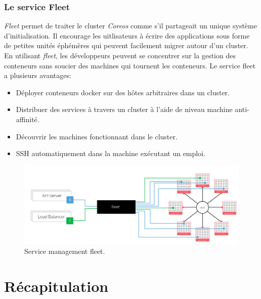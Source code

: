 \begin{onehalfspace}
\subsubsection{Le service Fleet}
\emph{Fleet} permet de traiter le cluster \emph{Coreos} comme s'il partageait un unique système d'initialisation. Il encourage les uitlisateurs à écrire des applications sous forme de petites unités éphémères qui peuvent facilement migrer autour d'un cluster. En utilisant \emph{fleet}, les développeurs peuvent se concentrer sur la gestion des conteneurs sans soucier des machines qui tournent les conteneurs. Le service fleet a plusieurs avantages: 
\begin{itemize}
\item Déployer conteneurs docker sur des hôtes arbitraires dans un cluster.
\item Distribuer des services à travers un cluster à l'aide de niveau machine anti-affinité.
\item Découvrir les machines fonctionnant dans le cluster.
\item SSH automatiquement dans la machine exécutant un emploi.
\end{itemize}
\begin{figure}[H]
\centering
\includegraphics [scale=0.5]{chapitre3/assets/fleet.png}
\caption{Service management fleet.}
\end{figure}
\end{onehalfspace}


\section{Récapitulation}


\def\arraystretch{1.6}%

